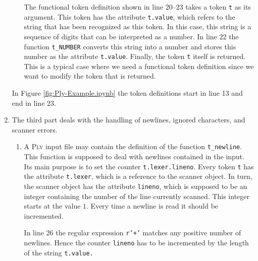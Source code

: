 \begin{enumerate}
\begin{enumerate}
            The functional token definition shown in line 20--23 takes a token \texttt{t} as its
            argument.  This token has the attribute \texttt{t.value}, which refers to the string that has been
            recognized as this token.  In this case, this string is a sequence of digits that can be
            interpreted as a number.  In line 22 the function  \texttt{t\_NUMBER} converts this string into a
            number and stores this number as the attribute \texttt{t.value}.  Finally, the token \texttt{t}
            itself is returned.  This is a typical case where we need a functional token definition since we 
            want to modify the token that is returned.
      \end{enumerate}
      In Figure \ref{fig:Ply-Example.ipynb} the token definitions start in line 13 and end in line 23.
\item The third part deals with the handling of newlines, ignored characters, and scanner errors.
  \begin{enumerate}
  \item A \textsc{Ply} input file may contain the definition of the function \texttt{t\_newline}.
        This function is supposed to deal with newlines contained in the input.  Its main purpose is to set the 
        counter \texttt{t.lexer.lineno}.  Every token \texttt{t} has the attribute \texttt{t.lexer}, which is a
        reference to the scanner object.  In turn, the scanner object has the attribute \texttt{lineno}, which
        is supposed to be an integer containing the number of the line currently scanned.  This integer starts
        at the value $1$.  Every time a newline is read it should be incremented.

        In line 26 the regular expression \texttt{r'+'} matches any positive number of newlines.
        Hence the counter \texttt{lineno} has to be incremented by the length of the string \texttt{t.value.}


\end{enumerate}
\end{enumerate}
